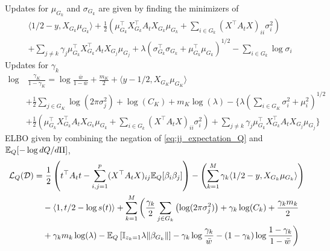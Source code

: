 Updates for $\mu_{G_k}$ and $\sigma_{G_k}$ are given by finding the minimizers of 
\begin{equation}
\begin{aligned}
    & 
    \langle 1/2 - y,  X_{G_k} \mu_{G_k} \rangle 
    + \frac{1}{2} \left( 
	\mu_{G_k}^\top X_{G_k}^\top A_t X_{G_k} \mu_{G_k} 
	+ \sum_{i \in G_k} (X^\top A_t X)_{ii} \sigma_{i}^2 
    \right)
    \\
    & 
    + \sum_{j \neq k} \gamma_j \mu_{G_k}^\top X_{G_k}^\top A_t X_{G_j} \mu_{G_j} 
    + \lambda \left( \sigma_{G_k}^\top \sigma_{G_k} + \mu_{G_k}^\top \mu_{G_k} \right)^{1/2} 
    - \sum_{i \in G_k}\log{\sigma_i}
\end{aligned}
\end{equation}
Updates for $\gamma_k$
\begin{equation}
\begin{aligned}
    \log &\ \frac{\gamma_K}{1-\gamma_K} = 
    \log \frac{\bar{w}}{1-\bar{w}}
    + \frac{m_K}{2}  
    + \langle y - 1/2, X_{G_K} \mu_{G_K} \rangle  
    \\
    &
    + \frac{1}{2} \sum_{j \in G_K} \log \left( 2 \pi \sigma_j^2 \right)
    + \log(C_K)
    + m_K \log (\lambda)
    - \Bigg\{ 
    \lambda \left( \sum_{i \in G_K} \sigma_i^2 + \mu_i^2 \right)^{1/2}  
    \\
    &
    + \frac{1}{2} \left( 
	\mu_{G_k}^\top X_{G_k}^\top A_t X_{G_k} \mu_{G_k} 
	+ \sum_{i \in G_k} (X^\top A_t X)_{ii} \sigma_{i}^2 
    \right)
    + \sum_{j \neq k} \gamma_j \mu_{G_k}^\top X_{G_k}^\top A_t X_{G_j} \mu_{G_j} 
\Bigg\}
\end{aligned}
\end{equation}
ELBO given by combining the negation of \eqref{eq:jj_expectation_Q} and $\mathbb{E}_Q[ - \log dQ / d\Pi]$,
\begin{equation}
\begin{aligned}
\mathcal{L}_Q(\mathcal{D}) =
    &\
    \frac{1}{2}
    \left(
	t^\top A_t t
	- \sum_{i,j=1}^p (X^\top A_t X)_{ij} \mathbb{E}_Q [ \beta_i \beta_j ]
    \right)
    - \left(
    \sum_{k = 1}^M 
	\gamma_k \langle 1/2 - y,  X_{G_k} \mu_{G_k} \rangle 
    \right) 
    \\
    &
    - \langle 1, t/2 - \log s(t) \rangle
    + \sum_{k=1}^M \bigg(  
	\frac{\gamma_k}{2} \sum_{j \in G_k} \left( \log( 2 \pi \sigma_j^2) \right)
	+ \gamma_k \log(C_k)
	+ \frac{\gamma_k m_k}{2} 
    \\
    &
	+ \gamma_k m_k \log (\lambda)
	- \mathbb{E}_Q \left[ \mathbb{I}_{z_k =1} \lambda \| \beta_{G_k} \| \right]
	- \gamma_k \log \frac{\gamma_k}{\bar{w}}
	- (1-\gamma_k) \log \frac{1 - \gamma_k}{1 - \bar{w}} 
    \bigg)
\end{aligned}
\end{equation}

